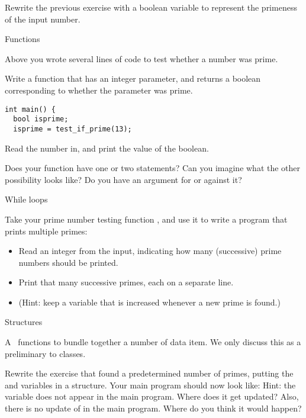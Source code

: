 \begin{exercise}
  \label{ex:prime:test2}
  Rewrite the previous exercise with a boolean variable to represent
  the primeness of the input number.
\end{exercise}

 {Functions}

\prerequisite{\ref{ch:function}}

Above you wrote several lines of code to test whether a number was
prime.

\begin{exercise}
  \label{ex:prime:func}
  Write a function  that has an integer parameter, and returns a boolean
  corresponding to whether the parameter was prime.
\begin{lstlisting}
int main() {
  bool isprime;
  isprime = test_if_prime(13);
\end{lstlisting}
  Read the number in, and print the value of the boolean.

  Does your function have one or two  statements?
  Can you imagine what the other possibility looks like?
  Do you have an argument for or against it?
\end{exercise}

 {While loops}

\prerequisite{\ref{sec:loopuntil}}

\begin{exercise}
  \label{ex:prime:while}
  Take your prime number testing function , and use it to
  write a program that prints multiple primes:
  \begin{itemize}
  \item Read an integer  from the input, indicating how
    many (successive) prime numbers should be printed.
  \item Print that many successive primes, each on a separate line.
  \item (Hint: keep a variable
     that is increased whenever a new prime is found.)
  \end{itemize}
\end{exercise}

 {Structures}

\prerequisite{\ref{sec:struct}, \ref{sec:reference}}

A~ functions to bundle together a number of data item. We
only discuss this as a preliminary to classes.

\begin{exercise}
  \label{ex:prime:struct}
  Rewrite the exercise that found a predetermined number of primes,
  putting the  and
   variables in a structure. Your main program should
  now look like:
  Hint: the variable  does not appear in the
  main program. Where does it get updated? Also, there is no update of
   in the main program. Where do you think
  it would happen?
\end{exercise}

